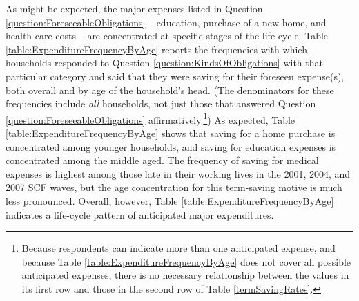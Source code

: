 \documentclass[fleqccn,12pt]{article}
\begin{document}
As might be expected, the major expenses listed in Question \ref{question:ForeseeableObligations} -- education, purchase of a new home, and health care costs -- are concentrated at specific stages of the life cycle. Table \ref{table:ExpenditureFrequencyByAge} reports the frequencies with which households responded to Question \ref{question:KindsOfObligations} with that particular category and said that they were saving for their foreseen expense(s), both overall and by age of the household's head. (The denominators for these frequencies include \emph{all} households, not just those that answered Question \ref{question:ForeseeableObligations} affirmatively.\footnote{Because respondents can indicate more than one anticipated expense, and because Table \ref{table:ExpenditureFrequencyByAge} does not cover all possible anticipated expenses, there is no necessary relationship between the values in its first row and those in the second row of Table \ref{termSavingRates}.}) As expected, Table \ref{table:ExpenditureFrequencyByAge} shows that saving for a home purchase is concentrated among younger households, and saving for education expenses is concentrated among the middle aged. The frequency of saving for medical expenses is highest among those late in their working lives in the 2001, 2004, and 2007 SCF waves, but the age concentration for this term-saving motive is much less pronounced. Overall, however, Table \ref{table:ExpenditureFrequencyByAge} indicates a life-cycle pattern of anticipated major expenditures. 
\end{document}

